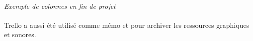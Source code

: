 \paragraph{}
\noindent
{}
\begin{center}
\textit{Exemple de colonnes en fin de projet}
\end{center}

\paragraph{}
Trello a aussi été utilisé comme mémo et pour archiver les ressources graphiques et sonores.

